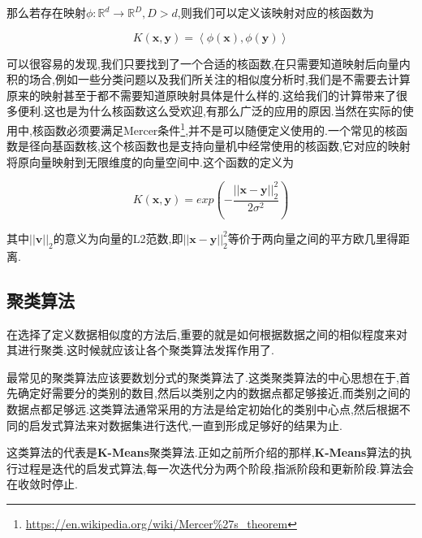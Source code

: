 那么若存在映射$\phi: \mathbb{R}^d \rightarrow \mathbb{R}^D, D>d$,则我们可以定义该映射对应的核函数为

\begin{equation}
	K(\mathbf{x}, \mathbf{y}) = \left<\phi(\mathbf{x}), \phi(\mathbf{y})\right>
\end{equation}

可以很容易的发现,我们只要找到了一个合适的核函数,在只需要知道映射后向量内积的场合,例如一些分类问题以及我们所关注的相似度分析时,我们是不需要去计算原来的映射甚至于都不需要知道原映射具体是什么样的.这给我们的计算带来了很多便利.这也是为什么核函数这么受欢迎,有那么广泛的应用的原因.当然在实际的使用中,核函数必须要满足Mercer条件\footnote{\url{https://en.wikipedia.org/wiki/Mercer\%27s_theorem}},并不是可以随便定义使用的.一个常见的核函数是径向基函数核,这个核函数也是支持向量机中经常使用的核函数,它对应的映射将原向量映射到无限维度的向量空间中.这个函数的定义为

\begin{equation}
	K(\mathbf{x},\mathbf{y}) = exp\left(-\frac{||\mathbf{x}-\mathbf{y}||^2_2}{2\sigma^2}\right)
\end{equation}

其中$||\mathbf{v}||_2$的意义为向量的L2范数,即$||\mathbf{x} - \mathbf{y}||^2_2$等价于两向量之间的平方欧几里得距离.


\subsection{聚类算法}\label{sec:cluster}

在选择了定义数据相似度的方法后,重要的就是如何根据数据之间的相似程度来对其进行聚类.这时候就应该让各个聚类算法发挥作用了.

最常见的聚类算法应该要数划分式的聚类算法了.这类聚类算法的中心思想在于,首先确定好需要分的类别的数目,然后以类别之内的数据点都足够接近,而类别之间的数据点都足够远.这类算法通常采用的方法是给定初始化的类别中心点,然后根据不同的启发式算法来对数据集进行迭代,一直到形成足够好的结果为止.

这类算法的代表是\textbf{K-Means}聚类算法.正如之前所介绍的那样,\textbf{K-Means}算法的执行过程是迭代的启发式算法,每一次迭代分为两个阶段,指派阶段和更新阶段.算法会在收敛时停止.

